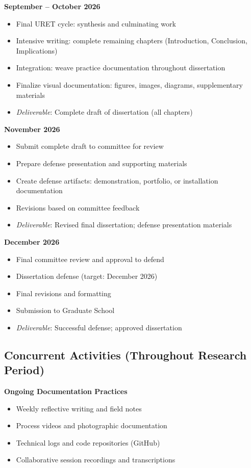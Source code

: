 \textbf{September – October 2026}
\begin{itemize}[noitemsep]
	\item Final URET cycle: synthesis and culminating work
	\item Intensive writing: complete remaining chapters (Introduction, Conclusion, Implications)
	\item Integration: weave practice documentation throughout dissertation
	\item Finalize visual documentation: figures, images, diagrams, supplementary materials
	\item \textit{Deliverable}: Complete draft of dissertation (all chapters)
\end{itemize}

\textbf{November 2026}
\begin{itemize}[noitemsep]
	\item Submit complete draft to committee for review
	\item Prepare defense presentation and supporting materials
	\item Create defense artifacts: demonstration, portfolio, or installation documentation
	\item Revisions based on committee feedback
	\item \textit{Deliverable}: Revised final dissertation; defense presentation materials
\end{itemize}

\textbf{December 2026}
\begin{itemize}[noitemsep]
	\item Final committee review and approval to defend
	\item Dissertation defense (target: December 2026)
	\item Final revisions and formatting
	\item Submission to Graduate School
	\item \textit{Deliverable}: Successful defense; approved dissertation
\end{itemize}

\subsection*{Concurrent Activities (Throughout Research Period)}

\textbf{Ongoing Documentation Practices}
\begin{itemize}[noitemsep]
	\item Weekly reflective writing and field notes
	\item Process videos and photographic documentation
	\item Technical logs and code repositories (GitHub)
	\item Collaborative session recordings and transcriptions
\end{itemize}


